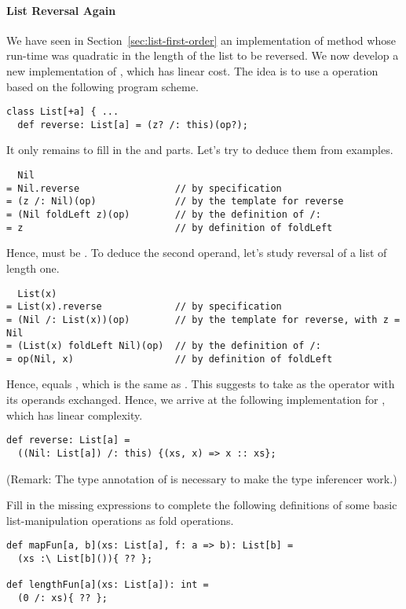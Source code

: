\paragraph{List Reversal Again} We have seen in 
Section~\ref{sec:list-first-order} an implementation of method
 whose run-time was quadratic in the length of the list
to be reversed. We now develop a new implementation of ,
which has linear cost.  The idea is to use a 
operation based on the following program scheme.
\begin{lstlisting}
class List[+a] { ...
  def reverse: List[a] = (z? /: this)(op?);
\end{lstlisting}
It only remains to fill in the  and  parts.  Let's
try to deduce them from examples.
\begin{lstlisting}
  Nil
= Nil.reverse                 // by specification
= (z /: Nil)(op)              // by the template for reverse
= (Nil foldLeft z)(op)        // by the definition of /:
= z                           // by definition of foldLeft
\end{lstlisting}
Hence,  must be . To deduce the second operand,
let's study reversal of a list of length one.
\begin{lstlisting}
  List(x)
= List(x).reverse             // by specification
= (Nil /: List(x))(op)        // by the template for reverse, with z = Nil
= (List(x) foldLeft Nil)(op)  // by the definition of /:
= op(Nil, x)                  // by definition of foldLeft
\end{lstlisting}
Hence,  equals , which is the same
as . This suggests to take as  the
\code{::} operator with its operands exchanged.  Hence, we arrive at
the following implementation for , which has linear complexity.
\begin{lstlisting}
def reverse: List[a] =
  ((Nil: List[a]) /: this) {(xs, x) => x :: xs};
\end{lstlisting}
(Remark: The type annotation of  is necessary 
to make the type inferencer work.)

\begin{exercise} Fill in the missing expressions to complete the following
definitions of some basic list-manipulation operations as fold
operations.
\begin{lstlisting}
def mapFun[a, b](xs: List[a], f: a => b): List[b] = 
  (xs :\ List[b]()){ ?? };

def lengthFun[a](xs: List[a]): int =
  (0 /: xs){ ?? };
\end{lstlisting}
\end{exercise}

